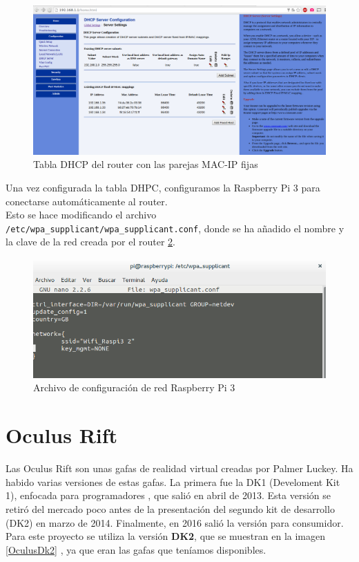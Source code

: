 \documentclass[twoside, 11pt]{epstfg}
\begin{document}
\begin{figure}[H]
	\centerline{
		\mbox{\includegraphics[width=.95\textwidth]{images/TablaDHCP2.png}}
	}
	\caption{Tabla DHCP del router con las parejas MAC-IP fijas}
	\label{Tabla DHPC}
\end{figure}

Una vez configurada la tabla DHPC, configuramos la Raspberry Pi 3 para conectarse automáticamente al router.\\
Esto se hace modificando el archivo \texttt{/etc/wpa\_supplicant/wpa\_supplicant.conf}, donde se ha añadido el nombre y la clave de la red creada por el router \ref{confwpa}. 

\begin{figure}[H]
	\centerline{
		\mbox{\includegraphics[width=.95\textwidth]{images/confRaspiWifi.png}}
	}
	\caption{Archivo de configuración de red Raspberry Pi 3}
	\label{confwpa}
\end{figure}
 
\newpage
\section{Oculus Rift}

Las Oculus Rift son unas gafas de realidad virtual creadas por Palmer Luckey.
Ha habido varias versiones de estas gafas.
La primera fue la DK1 (Develoment Kit 1), enfocada para programadores , que salió en abril de 2013. Esta versión se retiró del mercado poco antes de la presentación del segundo kit de desarrollo (DK2) en marzo de 2014.
Finalmente, en 2016 salió la versión para consumidor.\\
Para este proyecto se utiliza la versión \textbf{DK2}, que se muestran en la imagen \ref{OculusDk2} , ya que eran las gafas que teníamos disponibles.
\end{document}
